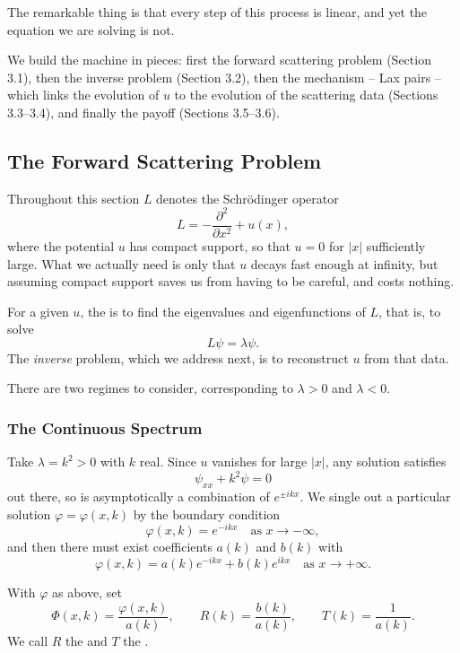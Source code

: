 \documentclass[a4paper]{scrartcl}
\begin{document}
The remarkable thing is that every step of this process is linear, and yet the equation we are solving is not.

We build the machine in pieces: first the forward scattering problem (Section 3.1), then the inverse problem (Section 3.2), then the mechanism -- Lax pairs -- which links the evolution of $u$ to the evolution of the scattering data (Sections 3.3--3.4), and finally the payoff (Sections 3.5--3.6).

\subsection{The Forward Scattering Problem}

Throughout this section $L$ denotes the Schr\"odinger operator
$$
L = -\frac{\partial^2}{\partial x^2} + u(x),
$$
where the potential $u$ has compact support, so that $u = 0$ for $|x|$ sufficiently large. What we actually need is only that $u$ decays fast enough at infinity, but assuming compact support saves us from having to be careful, and costs nothing.

For a given $u$, the  is to find the eigenvalues and eigenfunctions of $L$, that is, to solve
$$
L\psi = \lambda\psi.
$$
The \emph{inverse} problem, which we address next, is to reconstruct $u$ from that data.

There are two regimes to consider, corresponding to $\lambda > 0$ and $\lambda < 0$.

\subsubsection{The Continuous Spectrum}

Take $\lambda = k^2 > 0$ with $k$ real. Since $u$ vanishes for large $|x|$, any solution satisfies
$$
\psi_{xx} + k^2\psi = 0
$$
out there, so is asymptotically a combination of $e^{\pm ikx}$. We single out a particular solution $\varphi = \varphi(x,k)$ by the boundary condition
$$
\varphi(x,k) = e^{-ikx}\quad\text{as } x\to-\infty,
$$
and then there must exist coefficients $a(k)$ and $b(k)$ with
$$
\varphi(x,k) = a(k)e^{-ikx} + b(k)e^{ikx}\quad\text{as } x\to+\infty.
$$

\begin{definition}
	With $\varphi$ as above, set
	$$
	\Phi(x,k) = \frac{\varphi(x,k)}{a(k)}, \qquad R(k) = \frac{b(k)}{a(k)}, \qquad T(k) = \frac{1}{a(k)}.
	$$
	We call $R$ the  and $T$ the .
\end{definition}
\end{document}
